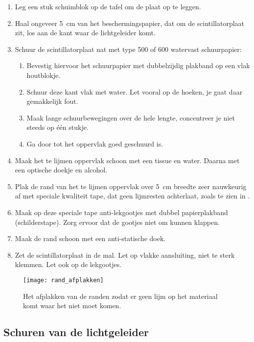 \begin{enumerate}
    \item Leg een stuk schuimblok op de tafel om de plaat op te leggen.
    \item Haal ongeveer \SI{5}{\centi\meter} van het beschermingspapier,
    dat om de scintillatorplaat zit, los aan de kant waar de lichtgeleider
    komt.
    \item Schuur de scintillatorplaat nat met type 500 of 600 watervast
    schuurpapier:
    \begin{enumerate}
        \item Bevestig hiervoor het schuurpapier met dubbelzijdig
        plakband op een vlak houtblokje.
        \item Schuur deze kant vlak met water. Let vooral op de hoeken,
        je gaat daar gemakkelijk fout.
        \item Maak lange schuurbewegingen over de hele lengte,
        concentreer je niet steeds op één stukje.
        \item Ga door tot het oppervlak goed geschuurd is.
    \end{enumerate}
    \item Maak het te lijmen oppervlak schoon met een tissue en water.
    Daarna met een optische doekje en alcohol.
    \item Plak de rand van het te lijmen oppervlak over
    \SI{5}{\centi\meter} breedte zeer nauwkeurig af met speciale
    kwaliteit tape, dat geen lijmresten achterlaat, zoals te zien in
    .
    \item Maak op deze speciale tape anti-lekgootjes met dubbel
    papierplakband (schilderstape). Zorg ervoor dat de gootjes niet om
    kunnen klappen.
    \item Maak de rand schoon met een anti-statische doek.
    \item Zet de scintillatorplaat in de mal. Let op vlakke aansluiting,
    niet te sterk klemmen. Let ook op de lekgootjes.
\end{enumerate}

\begin{figure}
    \centering
    \texttt{[image: rand\_afplakken]}
    \caption{Het afplakken van de randen zodat er geen lijm op het
             materiaal komt waar het niet moet komen.}
    \label{fig:rand_afplakken}
\end{figure}


\subsection{Schuren van de lichtgeleider}

